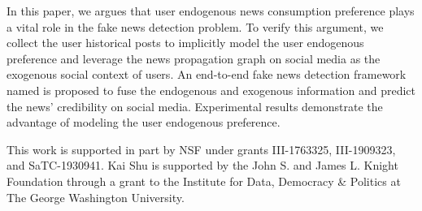 \documentclass[sigconf]{acmart}
\newcommand\UPFD{\xspace}
\begin{document}
In this paper, we argues that user endogenous news consumption preference plays a vital role in the fake news detection problem.
To verify this argument, we collect the user historical posts to implicitly model the user endogenous preference and leverage the news propagation graph on social media as the exogenous social context of users.
An end-to-end fake news detection framework named \UPFD is proposed to fuse the endogenous and exogenous information and predict the news' credibility on social media.
Experimental results demonstrate the advantage of modeling the user endogenous preference.


 


\begin{acks}
This work is supported in part by NSF under grants III-1763325, III-1909323, and SaTC-1930941. Kai Shu is supported by the John S. and James L. Knight Foundation through a grant to the Institute for Data, Democracy \& Politics at The George Washington University.
\end{acks}







\end{document}
